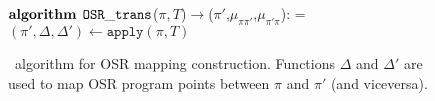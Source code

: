 \ifdefined\noauthorea
\begin{figure}[ht!]
\IncMargin{2em}
\begin{algorithm}[H]
\DontPrintSemicolon
\LinesNumbered
\SetAlgoNoLine
\SetNlSkip{1em} 
\Indm\Indmm
\hrulefill\\
\nonl\vspace{-2mm}\hrulefill\\
\nonl$\mathbf{algorithm} \> \> \text{${\tt OSR\_trans}$}$($\pi, T$)$\rightarrow$($\pi'$,$\mu_{\pi\pi'}$,$\mu_{\pi'\pi}$):\;
\everypar={\nl}
\Indp\Indpp
\vspace{1mm} $(\pi',\Delta,\Delta')\gets \texttt{apply}(\pi,T)$\;
\;
\vspace{-2mm}
\Indm\Indmm
\nonl\hrulefill\vspace{1mm}\\
\DecMargin{0.5em}
\caption{\label{alg:osr-trans} \osrtrans\ algorithm for OSR mapping construction. Functions $\Delta$ and $\Delta'$ are used to map OSR program points between $\pi$ and $\pi'$ (and viceversa).}
\IncMargin{0.5em}
\end{algorithm} 
\end{figure}

